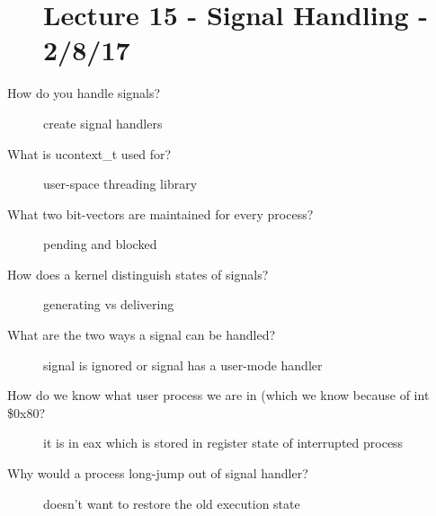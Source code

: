 \documentclass[10pt]{article}
\begin{document}
\begin{description}
\section{Lecture 15 - Signal Handling - 2/8/17}
\item[How do you handle signals?]
  create signal handlers
\item[What is ucontext\_t used for?]
  user-space threading library
\item[What two bit-vectors are maintained for every process?]
  pending and blocked
\item[How does a kernel distinguish states of signals?]
  generating vs delivering
\item[What are the two ways a signal can be handled?]
  signal is ignored or signal has a user-mode handler
\item[How do we know what user process we are in (which we know because of int \$0x80?]
  it is in eax which is stored in register state of interrupted process
\item[Why would a process long-jump out of signal handler?]
  doesn't want to restore the old execution state
\end{description}
\end{document}
